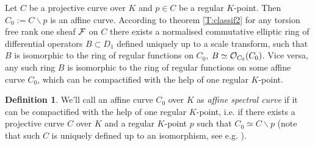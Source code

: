\documentclass[11pt]{article}
\theoremstyle{definition}
\newtheorem{Def}{Definition}[section]
\theoremstyle{plain}
\numberwithin{equation}{section}
\newcommand{\co}{{{\cal O}}}
\newcommand{\cf}{{{\cal F}}}
\begin{document}
Let $C$ be a projective curve over $K$ and $p\in C$ be a regular $K$-point. Then $C_0:=C\backslash p$ is an affine curve. According to theorem \ref{T:classif2} for any torsion free rank one sheaf $\cf$ on $C$ there exists a normalised commutative elliptic ring of differential operators $B\subset D_1$ defined uniquely up to a scale transform, such that $B$ is isomorphic to the ring of regular functions on $C_0$, $B\simeq \co_{C_0}(C_0)$. Vice versa, any such ring $B$ is isomorphic to the ring of regular functions on some affine curve $C_0$, which can be compactified with the help of one regular $K$-point. 

\begin{Def}
\label{D:affine_spec_curve}
We'll call an affine curve $C_0$ over $K$ as {\it affine spectral curve} if it can be compactified with the help of one regular $K$-point, i.e. if there exists a projective curve $C$ over $K$ and a regular $K$-point $p$ such that $C_0\simeq C\backslash p$ (note that such $C$ is uniquely defined up to an isomorphism, see e.g. \cite[Ch1., \S 6]{Ha}).
\end{Def}
\end{document}
